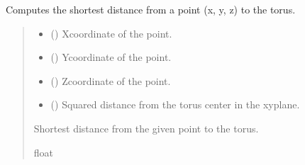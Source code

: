 \documentclass[letterpaper,10pt,english]{sphinxmanual}
\begin{document}
\begin{fulllineitems}
\begin{fulllineitems}
\begin{quote}
\begin{description}
\end{description}\end{quote}

\end{fulllineitems}


\begin{fulllineitems}
\label{\detokenize{src:src.Torus.Torus.distance}}
\pysigstartsignatures
{}
\pysigstopsignatures
\sphinxAtStartPar
Computes the shortest distance from a point (x, y, z) to the torus.
\begin{quote}\begin{description}
\begin{itemize}
\item {} 
\sphinxAtStartPar
{} () \textendash{} X\sphinxhyphen{}coordinate of the point.

\item {} 
\sphinxAtStartPar
{} () \textendash{} Y\sphinxhyphen{}coordinate of the point.

\item {} 
\sphinxAtStartPar
{} () \textendash{} Z\sphinxhyphen{}coordinate of the point.

\item {} 
\sphinxAtStartPar
{} () \textendash{} Squared distance from the torus center in the xy\sphinxhyphen{}plane.

\end{itemize}

\sphinxAtStartPar
Shortest distance from the given point to the torus.

\sphinxAtStartPar
float

\end{description}\end{quote}

\end{fulllineitems}


\end{fulllineitems}
\end{document}
